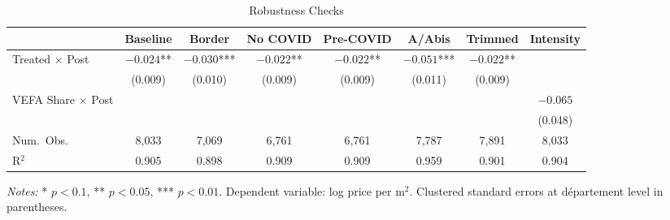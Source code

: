 \begin{table}[htbp]
\centering
\caption{Robustness Checks}
\label{tab:robustness}
\begin{adjustbox}{max width=\textwidth}
\begin{tabular}{lccccccc}
\toprule
& Baseline & Border & No COVID & Pre-COVID & A/Abis & Trimmed & Intensity \\
\midrule
Treated $\times$ Post & $-0.024$** & $-0.030$*** & $-0.022$** & $-0.022$** & $-0.051$*** & $-0.022$** & \\
& (0.009) & (0.010) & (0.009) & (0.009) & (0.011) & (0.009) & \\
VEFA Share $\times$ Post & & & & & & & $-0.065$ \\
& & & & & & & (0.048) \\
\midrule
Num.\ Obs. & 8,033 & 7,069 & 6,761 & 6,761 & 7,787 & 7,891 & 8,033 \\
R$^2$ & 0.905 & 0.898 & 0.909 & 0.909 & 0.959 & 0.901 & 0.904 \\
\bottomrule
\end{tabular}
\end{adjustbox}
\par\smallskip\noindent\small\textit{Notes:} * $p < 0.1$, ** $p < 0.05$, *** $p < 0.01$. Dependent variable: log price per m$^2$. Clustered standard errors at d\'{e}partement level in parentheses.
\end{table}
